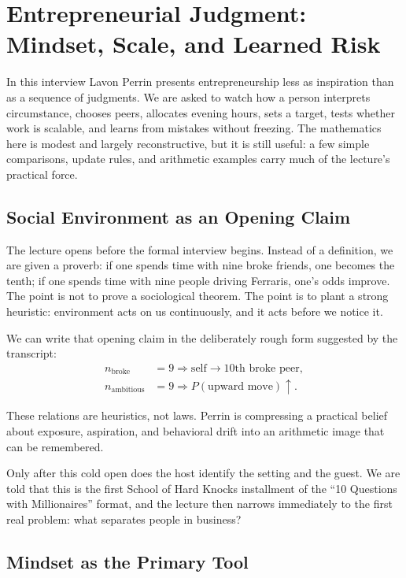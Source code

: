 \chapter{Entrepreneurial Judgment: Mindset, Scale, and Learned Risk}

In this interview Lavon Perrin presents entrepreneurship less as inspiration than as a sequence of judgments. We are asked to watch how a person interprets circumstance, chooses peers, allocates evening hours, sets a target, tests whether work is scalable, and learns from mistakes without freezing. The mathematics here is modest and largely reconstructive, but it is still useful: a few simple comparisons, update rules, and arithmetic examples carry much of the lecture's practical force.

\section{Social Environment as an Opening Claim}

The lecture opens before the formal interview begins. Instead of a definition, we are given a proverb: if one spends time with nine broke friends, one becomes the tenth; if one spends time with nine people driving Ferraris, one's odds improve. The point is not to prove a sociological theorem. The point is to plant a strong heuristic: environment acts on us continuously, and it acts before we notice it.

We can write that opening claim in the deliberately rough form suggested by the transcript:
\begin{align}
n_{\text{broke}} &= 9 \Rightarrow \text{self} \to \text{10th broke peer},\\
n_{\text{ambitious}} &= 9 \Rightarrow P(\text{upward move}) \uparrow .
\end{align}

\begin{remark}
These relations are heuristics, not laws. Perrin is compressing a practical belief about exposure, aspiration, and behavioral drift into an arithmetic image that can be remembered.
\end{remark}

Only after this cold open does the host identify the setting and the guest. We are told that this is the first School of Hard Knocks installment of the ``10 Questions with Millionaires'' format, and the lecture then narrows immediately to the first real problem: what separates people in business?

\section{Mindset as the Primary Tool}

